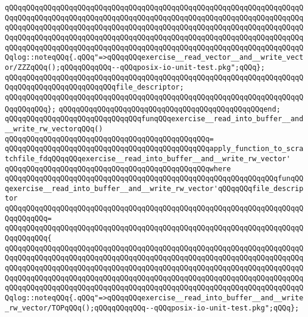 \newline
\verb|qQQqqQQqqQQqqQQqqQQqqQQqqQQqqQQqqQQqqQQqqQQqqQQqqQQqqQQqqQQqqQQqqQQqqQQqqQQqqQQqqQQqqQQqqQQqqQQqqQQqqQQqqQQqqQQqqQQqqQQqqQQqqQQqqQQqqQQqqQQqqQQqqQQqqQQqqQQqqQQqqQQqqQQqqQQqqQQqqQQqqQQqqQQqqQQqqQQqqQQqqQQqqQQqqQQqqQQqqQQqqQQqqQQqqQQqqQQqqQQqqQQqqQQqqQQqqQQqqQQqqQQqqQQqqQQqqQQqqQQqqQQqqQQqqQQqqQQqqQQqqQQqqQQqqQQqqQQqqQQqqQQqqQQqqQQqqQQqqQQqqQQqqQQqqQQqlog::noteqQQq{.qQQq"=>qQQqqQQqexercise__read_vector__and__write_vector/ZZZqQQq();qQQqqQQqqQQq--qQQqposix-io-unit-test.pkg";qQQq};|\newline
\verb|qQQqqQQqqQQqqQQqqQQqqQQqqQQqqQQqqQQqqQQqqQQqqQQqqQQqqQQqqQQqqQQqqQQqqQQqqQQqqQQqqQQqqQQqqQQqqQQqfile_descriptor;|\newline
\verb|qQQqqQQqqQQqqQQqqQQqqQQqqQQqqQQqqQQqqQQqqQQqqQQqqQQqqQQqqQQqqQQqqQQqqQQqqQQqqQQq};|\newline
\verb|qQQqqQQqqQQqqQQqqQQqqQQqqQQqqQQqqQQqqQQqqQQqqQQqend;|\newline
\newline
\verb|qQQqqQQqqQQqqQQqqQQqqQQqqQQqqQQqfunqQQqexercise__read_into_buffer__and__write_rw_vectorqQQq()|\newline
\verb|qQQqqQQqqQQqqQQqqQQqqQQqqQQqqQQqqQQqqQQqqQQqqQQq=|\newline
\verb|qQQqqQQqqQQqqQQqqQQqqQQqqQQqqQQqqQQqqQQqqQQqqQQqapply_function_to_scratchfile_fdqQQqqQQqexercise__read_into_buffer__and__write_rw_vector'|\newline
\verb|qQQqqQQqqQQqqQQqqQQqqQQqqQQqqQQqqQQqqQQqqQQqqQQqwhere|\newline
\verb|qQQqqQQqqQQqqQQqqQQqqQQqqQQqqQQqqQQqqQQqqQQqqQQqqQQqqQQqqQQqqQQqfunqQQqexercise__read_into_buffer__and__write_rw_vector'qQQqqQQqfile_descriptor|\newline
\verb|qQQqqQQqqQQqqQQqqQQqqQQqqQQqqQQqqQQqqQQqqQQqqQQqqQQqqQQqqQQqqQQqqQQqqQQqqQQqqQQq=|\newline
\verb|qQQqqQQqqQQqqQQqqQQqqQQqqQQqqQQqqQQqqQQqqQQqqQQqqQQqqQQqqQQqqQQqqQQqqQQqqQQqqQQq{|\newline
\verb|qQQqqQQqqQQqqQQqqQQqqQQqqQQqqQQqqQQqqQQqqQQqqQQqqQQqqQQqqQQqqQQqqQQqqQQqqQQqqQQqqQQqqQQqqQQqqQQqqQQqqQQqqQQqqQQqqQQqqQQqqQQqqQQqqQQqqQQqqQQqqQQqqQQqqQQqqQQqqQQqqQQqqQQqqQQqqQQqqQQqqQQqqQQqqQQqqQQqqQQqqQQqqQQqqQQqqQQqqQQqqQQqqQQqqQQqqQQqqQQqqQQqqQQqqQQqqQQqqQQqqQQqqQQqqQQqqQQqqQQqqQQqqQQqqQQqqQQqqQQqqQQqqQQqqQQqqQQqqQQqqQQqqQQqqQQqqQQqqQQqqQQqqQQqqQQqlog::noteqQQq{.qQQq"=>qQQqqQQqexercise__read_into_buffer__and__write_rw_vector/TOPqQQq();qQQqqQQqqQQq--qQQqposix-io-unit-test.pkg";qQQq};|\newline
